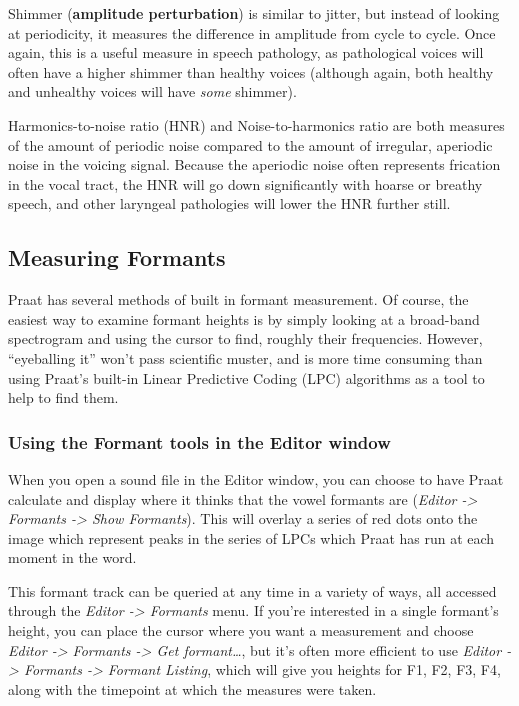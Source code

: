 Shimmer (\textbf{amplitude perturbation}) is similar to jitter, but
instead of looking at periodicity, it measures the difference in
amplitude from cycle to cycle. Once again, this is a useful measure in
speech pathology, as pathological voices will often have a higher
shimmer than healthy voices (although again, both healthy and unhealthy
voices will have \emph{some} shimmer).

Harmonics-to-noise ratio (HNR) and Noise-to-harmonics ratio are both
measures of the amount of periodic noise compared to the amount of
irregular, aperiodic noise in the voicing signal. Because the aperiodic
noise often represents frication in the vocal tract, the HNR will go
down significantly with hoarse or breathy speech, and other laryngeal
pathologies will lower the HNR further still.

\hypertarget{measuring-formants}{%
\subsection{Measuring Formants}\label{measuring-formants}}

\label{sub:measuringformants}

Praat has several methods of built in formant measurement. Of course,
the easiest way to examine formant heights is by simply looking at a
broad-band spectrogram and using the cursor to find, roughly their
frequencies. However, ``eyeballing it'' won't pass scientific muster,
and is more time consuming than using Praat's built-in Linear Predictive
Coding (LPC) algorithms as a tool to help to find them.

\hypertarget{using-the-formant-tools-in-the-editor-window}{%
\subsubsection{Using the Formant tools in the Editor
window}\label{using-the-formant-tools-in-the-editor-window}}

When you open a sound file in the Editor window, you can choose to have
Praat calculate and display where it thinks that the vowel formants are
(\emph{Editor -\textgreater{} Formants -\textgreater{} Show Formants}).
This will overlay a series of red dots onto the image which represent
peaks in the series of LPCs which Praat has run at each moment in the
word.

This formant track can be queried at any time in a variety of ways, all
accessed through the \emph{Editor -\textgreater{} Formants} menu. If
you're interested in a single formant's height, you can place the cursor
where you want a measurement and choose \emph{Editor -\textgreater{}
Formants -\textgreater{} Get formant\ldots{}}, but it's often more
efficient to use \emph{Editor -\textgreater{} Formants -\textgreater{}
Formant Listing}, which will give you heights for F1, F2, F3, F4, along
with the timepoint at which the measures were taken.

